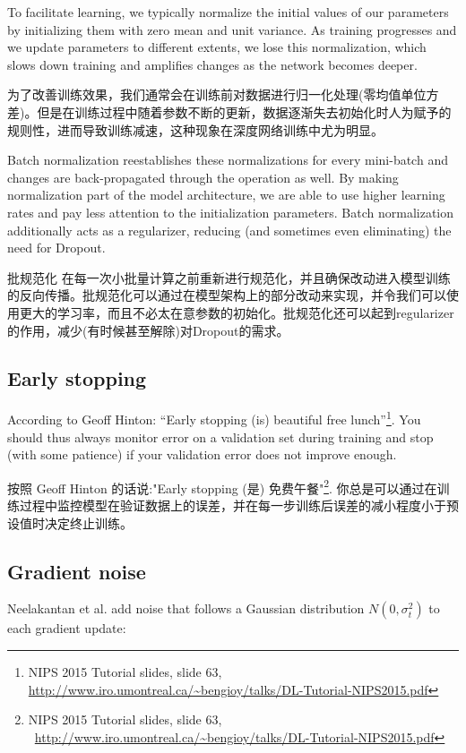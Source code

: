 \documentclass{article}
\begin{document}
To facilitate learning, we typically normalize the initial values of our parameters by initializing them with zero mean and unit variance. As training progresses and we update parameters to different extents, we lose this normalization, which slows down training and amplifies changes as the network becomes deeper.

为了改善训练效果，我们通常会在训练前对数据进行归一化处理(零均值单位方差)。但是在训练过程中随着参数不断的更新，数据逐渐失去初始化时人为赋予的规则性，进而导致训练减速，这种现象在深度网络训练中尤为明显。

Batch normalization \cite{Ioffe2015a} reestablishes these normalizations for every mini-batch and changes are back-propagated through the operation as well. By making normalization part of the model architecture, we are able to use higher learning rates and pay less attention to the initialization parameters. Batch normalization additionally acts as a regularizer, reducing (and sometimes even eliminating) the need for Dropout.

批规范化 \cite{Ioffe2015a} 在每一次小批量计算之前重新进行规范化，并且确保改动进入模型训练的反向传播。批规范化可以通过在模型架构上的部分改动来实现，并令我们可以使用更大的学习率，而且不必太在意参数的初始化。批规范化还可以起到regularizer的作用，减少(有时候甚至解除)对Dropout的需求。

\subsection{Early stopping}

According to Geoff Hinton: ``Early stopping (is) beautiful free lunch''\footnote{NIPS 2015 Tutorial slides, slide 63,  \url{http://www.iro.umontreal.ca/~bengioy/talks/DL-Tutorial-NIPS2015.pdf}}. You should thus always monitor error on a validation set during training and stop (with some patience) if your validation error does not improve enough.

按照 Geoff Hinton 的话说:"Early stopping (是) 免费午餐"\footnote{NIPS 2015 Tutorial slides, slide 63,  \url{http://www.iro.umontreal.ca/~bengioy/talks/DL-Tutorial-NIPS2015.pdf}}. 你总是可以通过在训练过程中监控模型在验证数据上的误差，并在每一步训练后误差的减小程度小于预设值时决定终止训练。

\subsection{Gradient noise}

Neelakantan et al. \cite{Neelakantan2015} add noise that follows a Gaussian distribution $N(0, \sigma^2_t)$ to each gradient update:
\end{document}
